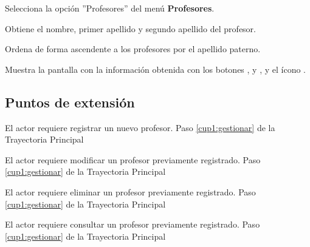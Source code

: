 \begin{UCtrayectoria}
	
	\UCpaso [\UCactor] Selecciona la opción ''Profesores'' del menú \textbf{Profesores}.
	
	\UCpaso [\UCsist] Obtiene el nombre, primer apellido y segundo apellido del profesor.
	
	\UCpaso [\UCsist] Ordena de forma ascendente a los profesores por el apellido paterno.
	
	\UCpaso[\UCsist] Muestra la pantalla  con la información obtenida con los botones ,  y , y el ícono \btnRegistrar. \label{cup1:gestionar}
\end{UCtrayectoria}

\subsection{Puntos de extensión}

\UCExtensionPoint 
{El actor requiere registrar un nuevo profesor.}
{Paso \ref{cup1:gestionar} de la Trayectoria Principal}
{}

\UCExtensionPoint 
{El actor requiere modificar un profesor previamente registrado.}
{Paso \ref{cup1:gestionar} de la Trayectoria Principal}
{}

\UCExtensionPoint 
{El actor requiere eliminar un profesor previamente registrado.}
{Paso \ref{cup1:gestionar} de la Trayectoria Principal}
{}

\UCExtensionPoint 
{El actor requiere consultar un profesor previamente registrado.}
{Paso \ref{cup1:gestionar} de la Trayectoria Principal}
{}


